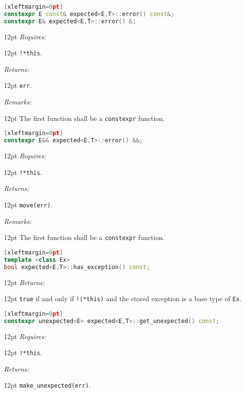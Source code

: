\documentclass[a4paper,10pt]{article}
\newcommand{\cpp}[1]{\lstinline{#1}}
\newcommand{\wordingItem}[1]{\noindent\textit{#1:}}
\newenvironment{wordingTextItem}[1]{\wordingItem{#1}\vspace{2pt}\noindent\begin{adjustwidth}{12pt}{}}{\vspace{2pt}\end{adjustwidth}}
\newenvironment{wordingPara}{\begin{adjustwidth}{12pt}{}}{\end{adjustwidth}}
\begin{document}
\begin{lstlisting}[language=C++][xleftmargin=0pt]
constexpr E const& expected<E,T>::error() const&;
constexpr E& expected<E,T>::error() &; 
\end{lstlisting}
\begin{wordingPara}
\begin{wordingTextItem}{Requires}
\cpp{!*this}.
\end{wordingTextItem}
\begin{wordingTextItem}{Returns}
\cpp{err}.
\end{wordingTextItem}
\begin{wordingTextItem}{Remarks}
The first function shall be a \cpp{constexpr} function.
\end{wordingTextItem}
\end{wordingPara}

\begin{lstlisting}[language=C++][xleftmargin=0pt]
constexpr E&& expected<E,T>::error() &&; 
\end{lstlisting}
\begin{wordingPara}
\begin{wordingTextItem}{Requires}
\cpp{!*this}.
\end{wordingTextItem}
\begin{wordingTextItem}{Returns}
\cpp{move(err)}.
\end{wordingTextItem}
\begin{wordingTextItem}{Remarks}
The first function shall be a \cpp{constexpr} function.
\end{wordingTextItem}
\end{wordingPara}

\begin{lstlisting}[language=C++][xleftmargin=0pt]
template <class Ex>
bool expected<E,T>::has_exception() const;
\end{lstlisting}
\begin{wordingPara}
\begin{wordingTextItem}{Returns}
\cpp{true} if and only if \cpp{!(*this)} and the stored exception is a base type of \cpp{Ex}.
\end{wordingTextItem}
\end{wordingPara}


\begin{lstlisting}[language=C++][xleftmargin=0pt]
constexpr unexpected<E> expected<E,T>::get_unexpected() const;
\end{lstlisting}
\begin{wordingPara}
\begin{wordingTextItem}{Requires}
\cpp{!*this}.
\end{wordingTextItem}
\begin{wordingTextItem}{Returns}
\cpp{make_unexpected(err)}.
\end{wordingTextItem}
\end{wordingPara}
\end{document}
